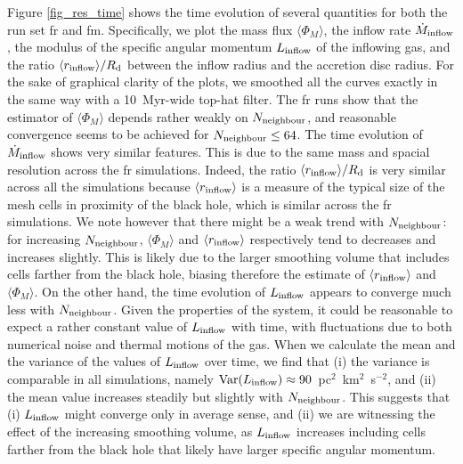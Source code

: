 \documentclass[a4paper,fleqn,usenatbib]{mnras}
\begin{document}
Figure \ref{fig_res_time} shows the time evolution of several quantities for both the run set fr and fm.
Specifically, we plot the mass flux $\langle \Phi_{M} \rangle$, the inflow rate $\dot{M}_{\rm inflow}$, the modulus of the specific angular momentum $L_{\rm inflow}$ of the inflowing gas, and the ratio $\langle r_{\rm inflow} \rangle / R_{\rm d}$ between the inflow radius and the accretion disc radius.
For the sake of graphical clarity of the plots, we smoothed all the curves exactly in the same way with a 10~Myr-wide top-hat filter.
The fr runs show that the estimator of $\langle \Phi_{M} \rangle$ depends rather weakly on $N_{\rm neighbour}$, and reasonable convergence seems to be achieved for $N_{\rm neighbour} \leq 64$.
The time evolution of $\dot{M}_{\rm inflow}$ shows very similar features.
This is due to the same mass and spacial resolution across the fr simulations.
Indeed, the ratio $\langle r_{\rm inflow} \rangle / R_{\rm d}$ is very similar across all the simulations because $\langle r_{\rm inflow} \rangle$ is a measure of the typical size of the mesh cells in proximity of the black hole, which is similar across the fr simulations.
We note however that there might be a weak trend with $N_{\rm neighbour}$: for increasing $N_{\rm neighbour}$, $\langle \Phi_{M} \rangle$ and $\langle r_{\rm inflow} \rangle$ respectively tend to decreases and increases slightly.
This is likely due to the larger smoothing volume that includes cells farther from the black hole, biasing therefore the estimate of $\langle r_{\rm inflow} \rangle$ and $\langle \Phi_{M} \rangle$.
On the other hand, the time evolution of $L_{\rm inflow}$ appears to converge much less with $N_{\rm neighbour}$.
Given the properties of the system, it could be reasonable to expect a rather constant value of $L_{\rm inflow}$ with time, with fluctuations due to both numerical noise and thermal motions of the gas.
When we calculate the mean and the variance of the values of $L_{\rm inflow}$ over time, we find that (i) the variance is comparable in all simulations, namely ${\rm Var}(L_{\rm inflow}) \approx 90$~pc$^2$~km$^2$~s$^{-2}$, and (ii) the mean value increases steadily but slightly with $N_{\rm neighbour}$.
This suggests that (i) $L_{\rm inflow}$ might converge only in average sense, and (ii) we are witnessing the effect of the increasing smoothing volume, as $L_{\rm inflow}$ increases including cells farther from the black hole that likely have larger specific angular momentum.
\end{document}
